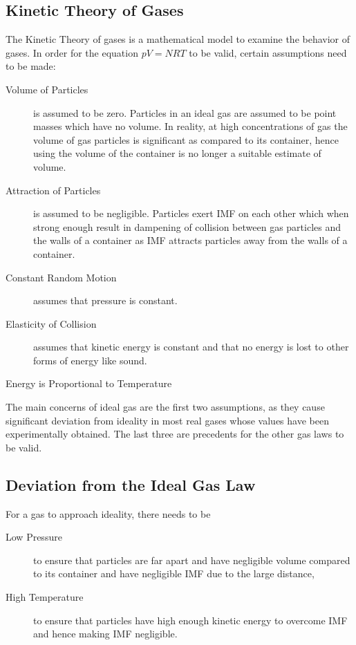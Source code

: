 \documentclass[../main]{subfiles}
\begin{document}
	\subsection{Kinetic Theory of Gases}

	The Kinetic Theory of gases is a mathematical model to examine the behavior of gases. In order for the equation \(pV=NRT\) to be valid, certain assumptions need to be made:

	\begin{description}
		\item[Volume of Particles] is assumed to be zero. Particles in an ideal gas are assumed to be point masses which have no volume. In reality, at high concentrations of gas the volume of gas particles is significant as compared to its container, hence using the volume of the container is no longer a suitable estimate of volume.
		\item[Attraction of Particles] is assumed to be negligible. Particles exert IMF on each other which when strong enough result in dampening of collision between gas particles and the walls of a container as IMF attracts particles away from the walls of a container.
		\item[Constant Random Motion] assumes that pressure is constant.
		\item[Elasticity of Collision] assumes that kinetic energy is constant and that no energy is lost to other forms of energy like sound.
		\item[Energy is Proportional to Temperature]
	\end{description}

	The main concerns of ideal gas are the first two assumptions, as they cause significant deviation from ideality in most real gases whose values have been experimentally obtained. The last three are precedents for the other gas laws to be valid.

	\subsection{Deviation from the Ideal Gas Law}

	For a gas to approach ideality, there needs to be

	\begin{description}
	\item[Low Pressure] to ensure that particles are far apart and have negligible volume compared to its container and have negligible IMF due to the large distance,
	\item[High Temperature] to ensure that particles have high enough kinetic energy to overcome IMF and hence making IMF negligible.
	\end{description}
\end{document}
